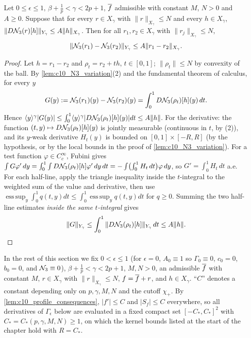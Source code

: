 \begin{lemma}
  \label{lem:c10_N3_mean_value}
  Let $0\le\epsilon\le1$, $\beta+\frac1p<\gamma<2p+1$, $\overline{f}$ admissible with constant $M$, $N>0$ and
  $A\ge0$. Suppose that for every $r\in X_\gamma$ with $\|r\|_{X_\gamma}\le N$ and every $h\in X_\gamma$,
  $\|D\mathcal{N}_3(r)[h]\|_{Y_\gamma}\le A\|h\|_{X_\gamma}$. Then for all $r_1,r_2\in X_\gamma$ with
  $\|r_j\|_{X_\gamma}\le N$,
  \[
    \|\mathcal{N}_3(r_1)-\mathcal{N}_3(r_2)\|_{Y_\gamma}\le A\|r_1-r_2\|_{X_\gamma}.
  \]
\end{lemma}
\begin{proof}
  Let $h=r_1-r_2$ and $\rho_t=r_2+th$, $t\in[0,1]$; $\|\rho_t\|\le N$ by convexity of the ball. By
  \cref{lem:c10_N3_variation}(2) and the fundamental theorem of calculus, for every $y$
  \[
    G(y):=\mathcal{N}_3(r_1)(y)-\mathcal{N}_3(r_2)(y)=\int_0^1D\mathcal{N}_3(\rho_t)[h](y)\,dt .
  \]
  Hence $\langle y \rangle^\gamma|G(y)|\le\int_0^1\langle y \rangle^\gamma|D\mathcal{N}_3(\rho_t)[h](y)|dt\le A\|h\|$. For the derivative:
  the function $(t,y)\mapsto D\mathcal{N}_3(\rho_t)[h](y)$ is jointly measurable (continuous in $t$, by (2)),
  and its $y$-weak derivative $H_t(y)$ is bounded on $[0,1]\times[-R,R]$ (by the hypothesis, or by the
  local bounds in the proof of \cref{lem:c10_N3_variation}). For a test function $\varphi\in C_c^\infty$,
  Fubini gives $\int G\varphi'\,dy=\int_0^1\int D\mathcal{N}_3(\rho_t)[h]\varphi'\,dy\,dt=-\int\bigl(\int_0^1H_t\,dt\bigr)\varphi\,dy$,
  so $G'=\int_0^1H_t\,dt$ a.e. For each half-line, apply the triangle inequality inside the $t$-integral
  to the weighted sum of the value and derivative, then use
  $\operatorname{ess\,sup}_y\int_0^1q(t,y)dt\le\int_0^1\operatorname{ess\,sup}_yq(t,y)dt$ for $q\ge0$.
  Summing the two half-line estimates \emph{inside the same $t$-integral} gives
  \[
    \|G\|_{Y_\gamma}\le\int_0^1\|D\mathcal{N}_3(\rho_t)[h]\|_{Y_\gamma}\,dt\le A\|h\|.
  \]
\end{proof}

In the rest of this section we fix $0<\epsilon\le1$ (for $\epsilon=0$, $A_0\equiv1$ so
$\Gamma_0\equiv0$, $c_0=0$, $b_0=0$, and $\mathcal{N}_3\equiv0$), $\beta+\frac1p<\gamma<2p+1$, $M,N>0$, an
admissible $\overline{f}$ with constant $M$, $r\in X_\gamma$ with $\|r\|_{X_\gamma}\le N$, $f=\overline{f}+r$, and
$h\in X_\gamma$. ``$C$'' denotes a constant depending only on $p,\gamma,M,N$ and the cutoff $\chi_+$.
By \cref{lem:c10_profile_consequences}, $|f'|\le C$ and $|S_f|\le C$ everywhere, so all derivatives of
$\Gamma_\epsilon$ below are evaluated in a fixed compact set $[-C_*,C_*]^2$ with $C_*=C_*(p,\gamma,M,N)\ge1$,
on which the kernel bounds listed at the start of the chapter hold with $R=C_*$.

